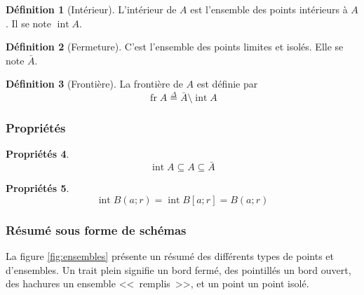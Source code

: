 \documentclass[11pt,a4paper]{article}
\theoremstyle{definition}
\newtheorem{mydef}{Définition}%
\newtheorem{myprop}[mydef]{Propriétés}
\DeclareMathOperator{\newint}{int}
\DeclareMathOperator{\newfr}{fr}
\newcommand{\eqdef}{\stackrel{\Delta}{=}}
\begin{document}
\begin{mydef}[Intérieur]
	L'intérieur de $A$ est l'ensemble des points intérieurs à $A$.
	Il se note $\newint A$.
\end{mydef}

\begin{mydef} [Fermeture]
	C'est l'ensemble des points limites et isolés.
	Elle se note $\bar{A}$.
\end{mydef}

\begin{mydef} [Frontière] La frontière de $A$ est définie par
	\[ \newfr A \eqdef \bar{A} \setminus \newint A \]
\end{mydef}

\subsubsection{Propriétés}

\begin{myprop}
	\[ \newint A \subseteq A \subseteq \bar{A} \]
\end{myprop}

\begin{myprop}
	\[ \newint B(a; r) = \newint B[a; r] = B(a; r) \]
\end{myprop}

\subsubsection{Résumé sous forme de schémas}

La figure \ref{fig:ensembles} présente un résumé des différents types de points et d'ensembles. Un trait plein signifie un bord fermé, des pointillés un bord ouvert, des hachures un ensemble <<~remplis~>>, et un point un point isolé.
\end{document}
